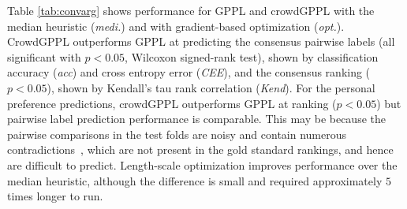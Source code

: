 Table \ref{tab:convarg} shows performance for GPPL and crowdGPPL with the median
heuristic (\emph{medi.}) and with gradient-based optimization (\emph{opt.}).
CrowdGPPL outperforms GPPL at predicting the consensus pairwise labels
(all significant with $p<0.05$, Wilcoxon signed-rank test), 
shown by classification accuracy (\emph{acc}) and cross entropy error (\emph{CEE}),
and the consensus ranking ($p<0.05$), shown by Kendall's tau rank correlation (\emph{Kend}).
For the personal preference predictions, crowdGPPL outperforms 
GPPL at ranking ($p<0.05$) but pairwise label prediction performance is comparable.
This may be because the pairwise comparisons in the test folds are noisy and contain
numerous contradictions~\citep{habernal2016argument}, 
which are not present in the gold standard rankings, and hence are difficult to predict.
Length-scale optimization improves performance over the median heuristic,
although the difference is small and required approximately $5$ times longer to run.
